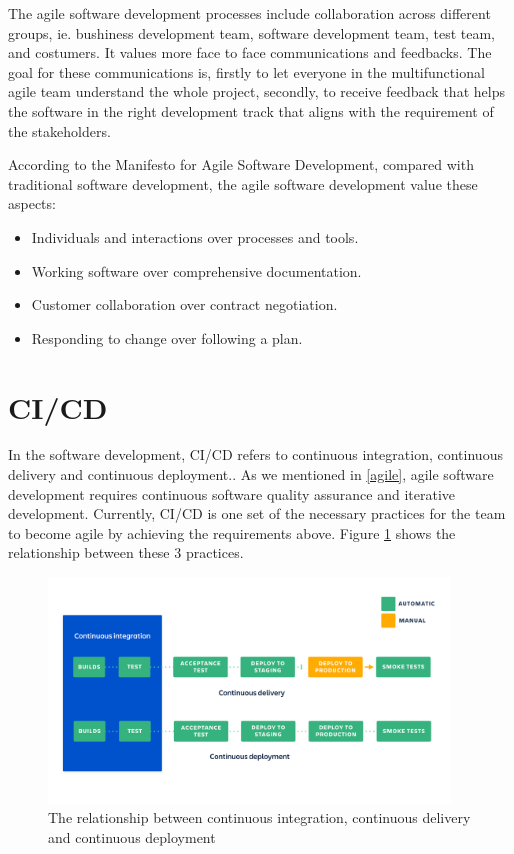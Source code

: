 \par
The agile software development processes include collaboration across different groups, ie. bushiness development team, software development team, test team, and costumers. It values more face to face communications\cite{beck2001principles} and feedbacks. The goal for these communications is, firstly to let everyone in the multifunctional agile team understand the whole project, secondly, to receive feedback that helps the software in the right development track that aligns with the requirement of the stakeholders. \cite{beck2001manifesto} 
\par
According to the Manifesto for Agile Software Development, compared with traditional software development, the agile software development value these aspects: \cite{beck2001manifesto}
\begin{itemize}
\item Individuals and interactions over processes and tools.
\item Working software over comprehensive documentation.
\item Customer collaboration over contract negotiation.
\item Responding to change over following a plan.
\end{itemize}
\section{CI/CD}
In the software development, CI/CD refers to continuous integration, continuous delivery and continuous deployment.\cite{Continuo67:online}. As we mentioned in \ref{agile}, agile software development requires continuous software quality assurance and iterative development. Currently, CI/CD is one set of the necessary practices for the team to become agile by achieving the requirements above. Figure \ref{fig:cicd} shows the relationship between these 3 practices.
\begin{figure}[h]
    \centering
    \includegraphics[width=0.95\textwidth]{pics/cicd.png}
    \caption{The relationship between continuous integration, continuous delivery and continuous deployment}
    \label{fig:cicd}
\end{figure}
